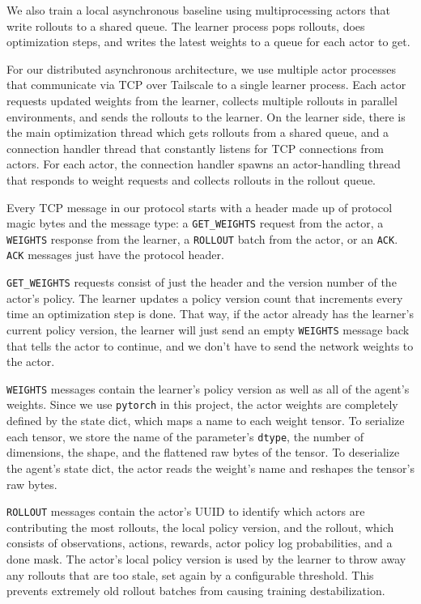 \documentclass{article}
\begin{document}
We also train a local asynchronous baseline using multiprocessing actors that write rollouts to a shared queue.
The learner process pops rollouts, does optimization steps, and writes the latest weights to a queue for each
actor to get.

For our distributed asynchronous architecture, we use multiple actor processes that communicate
via TCP over Tailscale to a single learner process. Each actor requests updated weights from the learner,
collects multiple rollouts in parallel environments, and sends the rollouts to the learner. On the learner
side, there is the main optimization thread which gets rollouts from a shared queue, and a connection handler
thread that constantly listens for TCP connections from actors. For each actor, the connection handler spawns
an actor-handling thread that responds to weight requests and collects rollouts in the rollout queue.

Every TCP message in our protocol starts with a header made up of protocol magic bytes and
the message type: a \verb|GET_WEIGHTS| request from the actor, a \verb|WEIGHTS| response from the learner,
a \verb|ROLLOUT| batch from the actor, or an \verb|ACK|. \verb|ACK| messages just have the protocol header.

\verb|GET_WEIGHTS| requests consist of just the header and the version number of the actor's policy. The learner
updates a policy version count that increments every time an optimization step is done. That way,
if the actor already has the learner's current policy version, the learner will just send an empty
\verb|WEIGHTS| message back that tells the actor to continue, and we don't have to send the network weights
to the actor.

\verb|WEIGHTS| messages contain the learner's policy version as well as all of the agent's weights. Since we use
\verb|pytorch| in this project, the actor weights are completely defined by the state dict, which maps a name to
each weight tensor. To serialize each tensor, we store the name of the parameter's \verb|dtype|, the number of
dimensions, the shape, and the flattened raw bytes of the tensor. To deserialize the agent's state dict, the actor
reads the weight's name and reshapes the tensor's raw bytes.

\verb|ROLLOUT| messages contain the actor's UUID to identify which actors are contributing the most rollouts,
the local policy version, and the rollout, which consists of observations, actions, rewards, actor policy log
probabilities, and a done mask. The actor's local policy version is used by the learner to throw away any
rollouts that are too stale, set again by a configurable threshold. This prevents extremely old rollout batches
from causing training destabilization.
\end{document}
